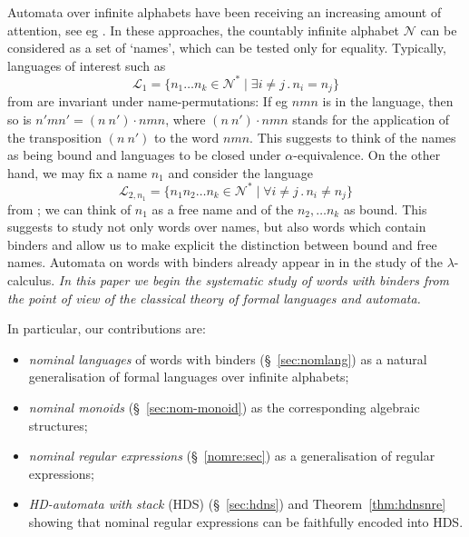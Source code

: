 \documentclass[runningheads,a4paper]{llncs}
\newcommand{\hdns}{HDS}
\newcommand{\names}{\mbox{$\mathcal{N}$}}
\newcommand{\namestar}{\mbox{$\mathcal{N^\ast}$}}
\begin{document}
Automata over infinite alphabets have been receiving an increasing
amount of attention, see eg
\cite{kaminskifrancez94,segoufin:csl06,bojanczyk:stacs11,tze11}. In
these approaches, the countably infinite alphabet $\names$ can be
considered as a set of `names', which can be tested only for
equality. Typically, languages of interest such as
\begin{equation}\label{exle:lang-kf1}
\mathcal{L}_1 = \{n_1\ldots n_k \in\namestar\mid \exists i \not= j\,.\,  n_i=n_j\}
\end{equation}
from \cite{kaminskifrancez94} are invariant under name-permutations:
If eg $nmn$ is in the language, then so is $n'mn'=(n\ n')\cdot nmn$,
where $(n\ n')\cdot nmn$ stands for the application of the transposition
$(n\ n')$ to the word $nmn$. This suggests to think of the names as
being bound and languages to be closed under $\alpha$-equivalence. On
the other hand, we may fix a name $n_1$ and consider the language
\begin{equation}\label{exle:lang-kf2}
  \mathcal{L}_{2,n_1} = \{n_1 n_2\ldots n_k \in\namestar \mid \forall
  i\not=j\,.\, n_i\not= n_j\}
\end{equation}
from \cite{tze11}; we can think of $n_1$ as a free name and of the
$n_2, \ldots n_k$ as bound. This suggests to study not only words over
names, but also words which contain binders and allow us to make
explicit the distinction between bound and free names. Automata on
words with binders already appear in \cite{stirling:fossacs09} in the
study of the $\lambda$-calculus. \emph{In this paper we begin the
  systematic study of words with binders from the point of view of the
  classical theory of formal languages and automata.}

\medskip\noindent In particular, our contributions are:
\begin{itemize}
\item \emph{nominal languages} of words with binders
  (\S~\ref{sec:nomlang}) as a natural generalisation of formal
  languages over infinite alphabets;
\item \emph{nominal monoids} (\S~\ref{sec:nom-monoid}) as the
  corresponding algebraic structures;
\item \emph{nominal regular expressions} (\S~\ref{nomre:sec}) as a
  generalisation of regular expressions;
\item \emph{HD-automata with stack} (\hdns) (\S~\ref{sec:hdns}) and
  Theorem~\ref{thm:hdnsnre} showing that nominal regular expressions
  can be faithfully encoded into \hdns.
\end{itemize}
\end{document}
